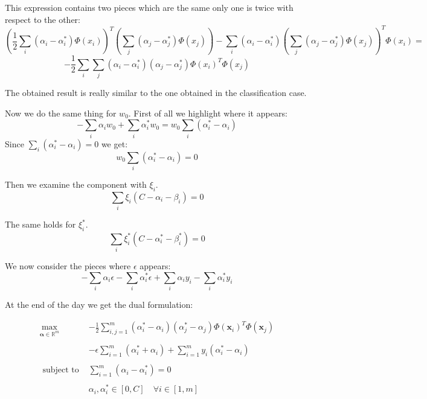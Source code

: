 This expression contains two pieces which are the same only one is twice with
respect to the other:
\[
	(\frac{1}{2}\sum_{i}(\alpha_{i}- \alpha_{i}^{*}) \Phi(x_{i}))^{T}(\sum_{j}( \alpha
	_{j}- \alpha_{j}^{*}) \Phi(x_{j})) - \sum_{i}(\alpha_{i}- \alpha_{i}^{*}) (\sum
	_{j}(\alpha_{j}- \alpha_{j}^{*}) \Phi(x_{j}))^{T}\Phi(x_{i}) =
\]
\[
	-\frac{1}{2}\sum_{i}\sum_{j}(\alpha_{i}- \alpha_{i}^{*}) (\alpha_{j}- \alpha_{j}
	^{*}) \Phi(x_{i})^{T}\Phi(x_{j})
\]

The obtained result is really similar to the one obtained in the classification
case.
\newline

Now we do the same thing for $w_{0}$. First of all we highlight where it appears:
\[
	- \sum_{i}\alpha_{i}w_{0}+ \sum_{i}\alpha_{i}^{*}w_{0}= w_{0}\sum_{i}(\alpha_{i}
	^{*}- \alpha_{i})
\]
Since $\sum_{i}(\alpha_{i}^{*}- \alpha_{i}) = 0$ we get:
\[
	w_{0}\sum_{i}(\alpha_{i}^{*}- \alpha_{i}) = 0
\]

Then we examine the component with $\xi_{i}$.
\[
	\sum_{i}\xi_{i}(C - \alpha_{i}- \beta_{i}) = 0
\]

The same holds for $\xi_{i}^{*}$.
\[
	\sum_{i}\xi_{i}^{*}(C - \alpha_{i}^{*}- \beta_{i}^{*}) = 0
\]

We now consider the pieces where $\epsilon$ appears:
\[
	- \sum_{i}\alpha_{i}\epsilon - \sum_{i}\alpha_{i}^{*}\epsilon + \sum_{i}\alpha_{i}
	y_{i}- \sum_{i}\alpha_{i}^{*}y_{i}
\]

At the end of the day we get the dual formulation:

\[
	\begin{array}{cl}
		\max _{\boldsymbol{\alpha} \in \mathbb{R}^m} & -\frac{1}{2} \sum_{i, j=1}^m\left(\alpha_i^*-\alpha_i\right)\left(\alpha_j^*-\alpha_j\right) \Phi\left(\mathbf{x}_i\right)^T \Phi\left(\mathbf{x}_j\right) \\
		\\
		                                             & -\epsilon \sum_{i=1}^m\left(\alpha_i^*+\alpha_i\right)+\sum_{i=1}^m y_i\left(\alpha_i^*-\alpha_i\right)                                                    \\
		\\
		\text{ subject to }                          & \sum_{i=1}^m\left(\alpha_i-\alpha_i^*\right)=0                                                                                                             \\
		\\
		                                             & \alpha_i, \alpha_i^* \in[0, C] \quad \forall i \in[1, m]
	\end{array}
\]

